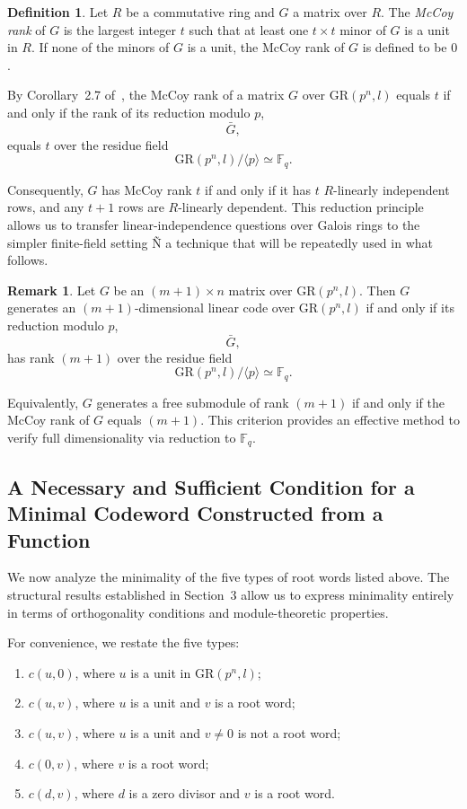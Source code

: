 \documentclass[10pt]{article}
\theoremstyle{definition}
\newtheorem{definition}[lem]{Definition}
\newtheorem{remark}[lem]{Remark}
\begin{document}
\begin{definition}
Let $R$ be a commutative ring and $G$ a matrix over $R$.
The \emph{McCoy rank} of $G$ is the largest integer $t$
such that at least one $t\times t$ minor of $G$ is a unit in $R$.
If none of the minors of $G$ is a unit,
the McCoy rank of $G$ is defined to be $0$.
\end{definition}

By Corollary~2.7 of~\cite{NortonSalagean},
the McCoy rank of a matrix $G$ over $\mathrm{GR}(p^n,l)$ equals $t$
if and only if the rank of its reduction modulo $p$,
\[
\bar{G},
\]
equals $t$ over the residue field
\[
\mathrm{GR}(p^n,l)/\langle p\rangle
\simeq \mathbb{F}_q.
\]

Consequently, $G$ has McCoy rank $t$
if and only if it has $t$ $R$-linearly independent rows,
and any $t+1$ rows are $R$-linearly dependent.
This reduction principle allows us to transfer linear-independence
questions over Galois rings to the simpler finite-field setting Ñ
a technique that will be repeatedly used in what follows.

\begin{remark}\label{Remark 14}
Let $G$ be an $(m+1)\times n$ matrix over $\mathrm{GR}(p^n,l)$.
Then $G$ generates an $(m+1)$-dimensional linear code over
$\mathrm{GR}(p^n,l)$ if and only if its reduction modulo $p$,
\[
\bar{G},
\]
has rank $(m+1)$ over the residue field
\[
\mathrm{GR}(p^n,l)/\langle p\rangle \simeq \mathbb{F}_q.
\]

Equivalently, $G$ generates a free submodule of rank $(m+1)$
if and only if the McCoy rank of $G$ equals $(m+1)$.
This criterion provides an effective method to verify full dimensionality
via reduction to $\mathbb{F}_q$.
\end{remark}

\subsection{A Necessary and Sufficient Condition for a Minimal Codeword Constructed from a Function}

We now analyze the minimality of the five types of root words listed above.
The structural results established in Section~3 allow us to express minimality
entirely in terms of orthogonality conditions and module-theoretic properties.

For convenience, we restate the five types:

\begin{enumerate}
\item $c(u,0)$, where $u$ is a unit in $\mathrm{GR}(p^n,l)$;

\item $c(u,v)$, where $u$ is a unit and $v$ is a root word;

\item $c(u,v)$, where $u$ is a unit and $v\neq 0$ is not a root word;

\item $c(0,v)$, where $v$ is a root word;

\item $c(d,v)$, where $d$ is a zero divisor and $v$ is a root word.
\end{enumerate}
\end{document}
